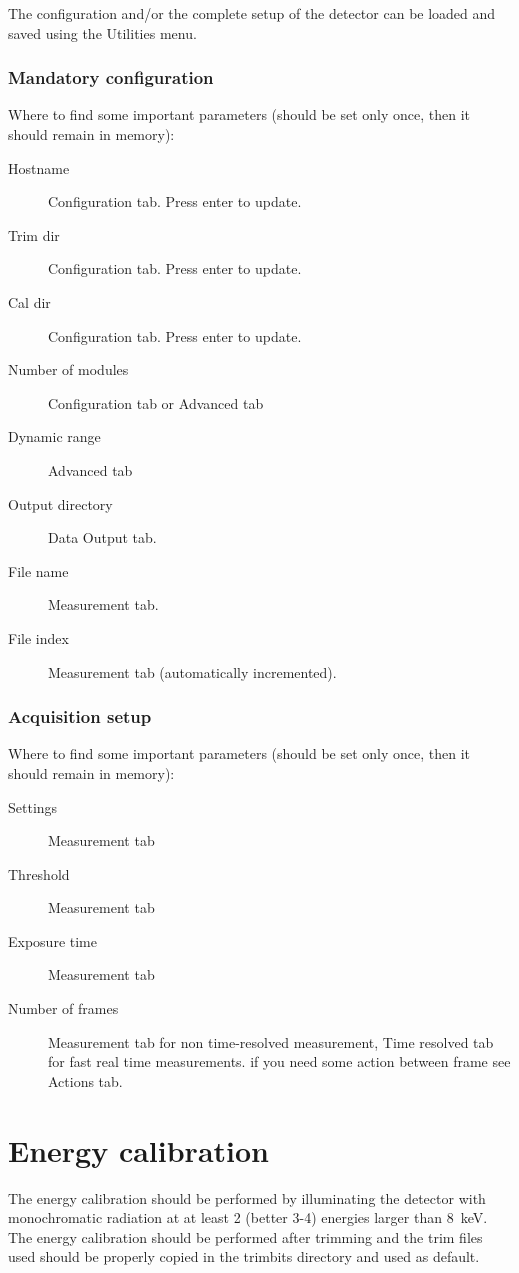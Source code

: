\documentclass{report}
\begin{document}
The configuration and/or the complete setup of the detector can be loaded and saved using the Utilities menu.



\subsection{Mandatory configuration}
Where to find some important parameters (should be set only once, then it should remain in memory):
\begin{description}
\item[Hostname] Configuration tab. Press enter to update.
\item[Trim dir] Configuration tab. Press enter to update.
\item[Cal dir] Configuration tab. Press enter to update.
\item[Number of modules] Configuration tab or Advanced tab
\item[Dynamic range] Advanced tab
\item[Output directory] Data Output tab.
\item[File name] Measurement tab.
\item[File index] Measurement tab (automatically incremented).
\end{description}


\subsection{Acquisition setup}
Where to find some important parameters (should be set only once, then it should remain in memory):
\begin{description}
\item[Settings] Measurement tab
\item[Threshold] Measurement tab
\item[Exposure time] Measurement tab
\item[Number of frames] Measurement tab for non time-resolved measurement, Time resolved tab for fast real time measurements. if you need some action between frame see Actions tab.
\end{description}

\chapter{Energy calibration} \label{sec:encal}
The energy calibration should be performed by illuminating the detector with monochromatic radiation at at least 2 (better 3-4) energies larger than 8~keV. The energy calibration should be performed after trimming and the trim files used should be properly copied in the trimbits directory and used as default.
\end{document}
